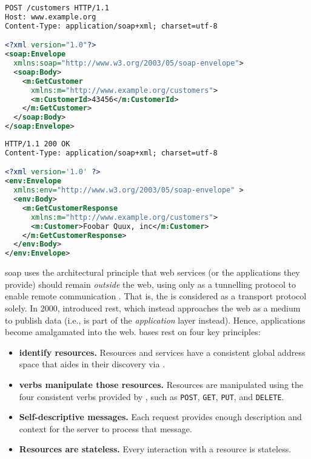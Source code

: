 \begin{lstlisting}[language=xml,label=lst:background:apis:soap-request,caption={[An example SOAP request]A \gls{soap} \glsac{http} \texttt{POST} consumer request to retrieve customer record \#43456 from a web service provider. Source: \citep{Ballinger:2014aa}.}]
POST /customers HTTP/1.1
Host: www.example.org
Content-Type: application/soap+xml; charset=utf-8

<?xml version="1.0"?>
<soap:Envelope 
  xmlns:soap="http://www.w3.org/2003/05/soap-envelope">
  <soap:Body>
    <m:GetCustomer 
      xmlns:m="http://www.example.org/customers">
      <m:CustomerId>43456</m:CustomerId>
    </m:GetCustomer>
  </soap:Body>
</soap:Envelope>
\end{lstlisting}
\begin{lstlisting}[language=xml,label=lst:background:apis:soap-response,caption={[An example SOAP response]The \gls{soap} \glsac{http} service provider response for \cref{lst:background:apis:soap-request}. Source: \citep{Ballinger:2014aa}.}]
HTTP/1.1 200 OK
Content-Type: application/soap+xml; charset=utf-8

<?xml version='1.0' ?>
<env:Envelope 
  xmlns:env="http://www.w3.org/2003/05/soap-envelope" >
  <env:Body>
    <m:GetCustomerResponse 
      xmlns:m="http://www.example.org/customers">
      <m:Customer>Foobar Quux, inc</m:Customer>
    </m:GetCustomerResponse>
  </env:Body>
</env:Envelope>
\end{lstlisting}

\gls{soap} uses the architectural principle that web services (or the applications they provide) should remain \textit{outside} the web, using  only as a tunnelling protocol to enable remote communication \citep{Pautasso2008}. That is, the  is considered as a transport protocol solely. In 2000, \citet{Fielding:2000vh} introduced \gls{rest}, which instead approaches the web as a medium to publish data (i.e.,  is part of the \textit{application} layer instead). Hence, applications become amalgamated into the web. \citeauthor{Fielding:2000vh} bases \gls{rest} on four key principles:

\begin{itemize}
  \item \textbf{ identify resources.} Resources and services have a consistent global address space that aides in their discovery via  \citep{BernersLee:2004vf}.
  \item \textbf{ verbs manipulate those resources.} Resources are manipulated using the four consistent  verbs provided by , such as \texttt{POST}, \texttt{GET}, \texttt{PUT}, and \texttt{DELETE}.
  \item \textbf{Self-descriptive messages.} Each request provides enough description and context for the server to process that message.
  \item \textbf{Resources are stateless.} Every interaction with a resource is stateless.
\end{itemize}

